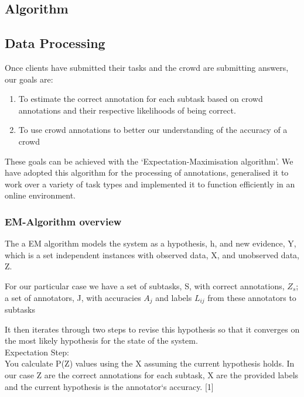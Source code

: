 \documentclass[11pt]{article}
\begin{document}
\subsection{Algorithm}

\subsection{Data Processing}

Once clients have submitted their tasks and the crowd are submitting answers, our goals are:
\begin{enumerate}
\item To estimate the correct annotation for each subtask based on crowd annotations and their respective likelihoods of being correct.
\item To use crowd annotations to better our understanding of the accuracy of a crowd
\end{enumerate}

These goals can be achieved with the `Expectation-Maximisation algorithm'. We have adopted this algorithm for the processing of annotations, generalised it to work over a variety of task types and implemented it to function efficiently in an online environment.\\

\subsubsection{EM-Algorithm overview}

The a EM algorithm models the system as a hypothesis, h, and new evidence, Y, which is a set independent instances with observed data, X, and unobserved data, Z.

For our particular case we have a set of subtasks, S, with correct annotations, $Z_{s}$; a set of annotators, J, with accuracies $A_{j}$ and labels $L_{ij}$ from these annotators to subtasks

It then iterates through two steps to revise this hypothesis so that it converges on the most likely hypothesis for the state of the system.\\

Expectation Step:\\
You calculate P(Z) values using the X assuming the current hypothesis holds. In our case Z are the correct annotations for each subtask, X are the provided labels and the current hypothesis is the annotator`s accuracy. [1]\\
\end{document}
